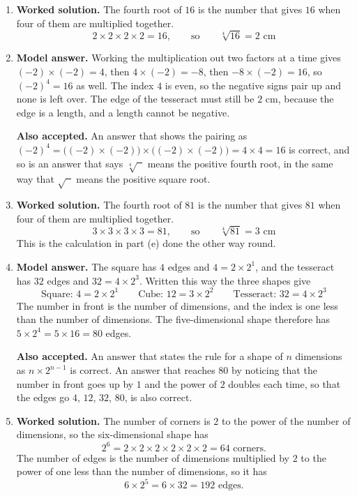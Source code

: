 \documentclass[12pt,a4paper]{article}
\newcommand{\wsol}{\par\smallskip
  \noindent\textbf{\color{blue!50!black}Worked solution.}\space}
\newcommand{\modelans}{\par\smallskip
  \noindent\textbf{\color{blue!50!black}Model answer.}\space}
\newcommand{\alsoacc}{\par\smallskip
  \noindent\textbf{\color{blue!50!black}Also accepted.}\space}
\begin{document}
\begin{enumerate}
\item
\wsol
The fourth root of $16$ is the number that gives $16$ when four of them are
multiplied together.
\[2\times2\times2\times2=16,\qquad\text{so}\qquad\sqrt[4]{16}=2\text{ cm}\]

\item
\modelans
Working the multiplication out two factors at a time gives $(-2)\times(-2)=4$,
then $4\times(-2)=-8$, then $-8\times(-2)=16$, so $(-2)^4=16$ as well. The
index $4$ is even, so the negative signs pair up and none is left over. The
edge of the tesseract must still be $2$ cm, because the edge is a length, and a
length cannot be negative.
\alsoacc
An answer that shows the pairing as
$(-2)^4=\big((-2)\times(-2)\big)\times\big((-2)\times(-2)\big)=4\times4=16$ is
correct, and so is an answer that says $\sqrt[4]{\phantom{a}}$ means the
positive fourth root, in the same way that $\sqrt{\phantom{a}}$ means the
positive square root.

\item
\wsol
The fourth root of $81$ is the number that gives $81$ when four of them are
multiplied together.
\[3\times3\times3\times3=81,\qquad\text{so}\qquad\sqrt[4]{81}=3\text{ cm}\]
This is the calculation in part (e) done the other way round.

\item
\modelans
The square has $4$ edges and $4=2\times2^1$, and the tesseract has $32$ edges
and $32=4\times2^3$. Written this way the three shapes give
\[\text{Square: }4=2\times2^1\qquad\text{Cube: }12=3\times2^2\qquad
  \text{Tesseract: }32=4\times2^3\]
The number in front is the number of dimensions, and the index is one less than
the number of dimensions. The five-dimensional shape therefore has
$5\times2^4=5\times16=80$ edges.
\alsoacc
An answer that states the rule for a shape of $n$ dimensions as
$n\times2^{n-1}$ is correct. An answer that reaches $80$ by noticing that the
number in front goes up by $1$ and the power of $2$ doubles each time, so that
the edges go $4$, $12$, $32$, $80$, is also correct.

\item
\wsol
The number of corners is $2$ to the power of the number of dimensions, so the
six-dimensional shape has
\[2^6=2\times2\times2\times2\times2\times2=64\text{ corners.}\]
The number of edges is the number of dimensions multiplied by $2$ to the power
of one less than the number of dimensions, so it has
\[6\times2^5=6\times32=192\text{ edges.}\]
\end{enumerate}
\end{document}
